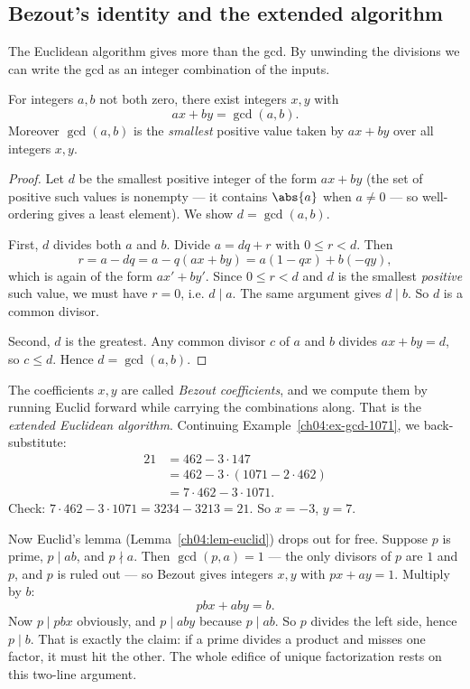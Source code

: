 \subsection*{Bezout's identity and the extended algorithm}

The Euclidean algorithm gives more than the gcd. By unwinding the divisions we can write the gcd as
an integer combination of the inputs.

\begin{theorem}
\label{ch04:thm-bezout}
For integers $a, b$ not both zero, there exist integers $x, y$ with
\[
  ax + by = \gcd(a, b).
\]
Moreover $\gcd(a,b)$ is the \emph{smallest} positive value taken by $ax + by$ over all integers
$x, y$.
\end{theorem}

\begin{proof}
Let $d$ be the smallest positive integer of the form $ax + by$ (the set of positive such values is
nonempty --- it contains $\abs{a}$ when $a \neq 0$ --- so well-ordering gives a least element). We
show $d = \gcd(a, b)$.

First, $d$ divides both $a$ and $b$. Divide $a = dq + r$ with $0 \le r < d$. Then
\[
  r = a - dq = a - q(ax + by) = a(1 - qx) + b(-qy),
\]
which is again of the form $a x' + b y'$. Since $0 \le r < d$ and $d$ is the smallest
\emph{positive} such value, we must have $r = 0$, i.e. $d \mid a$. The same argument gives
$d \mid b$. So $d$ is a common divisor.

Second, $d$ is the greatest. Any common divisor $c$ of $a$ and $b$ divides $ax + by = d$, so
$c \le d$. Hence $d = \gcd(a, b)$.
\end{proof}

The coefficients $x, y$ are called \emph{Bezout coefficients}, and we compute them by running
Euclid forward while carrying the combinations along. That is the \emph{extended Euclidean
algorithm}. Continuing Example~\ref{ch04:ex-gcd-1071}, we back-substitute:
\[
\begin{aligned}
21 &= 462 - 3 \cdot 147 \\
   &= 462 - 3 \cdot (1071 - 2 \cdot 462) \\
   &= 7 \cdot 462 - 3 \cdot 1071.
\end{aligned}
\]
Check: $7 \cdot 462 - 3 \cdot 1071 = 3234 - 3213 = 21$. So $x = -3$, $y = 7$.

\begin{whybox}
Now Euclid's lemma (Lemma~\ref{ch04:lem-euclid}) drops out for free. Suppose $p$ is prime,
$p \mid ab$, and $p \nmid a$. Then $\gcd(p, a) = 1$ --- the only divisors of $p$ are $1$ and $p$,
and $p$ is ruled out --- so Bezout gives integers $x, y$ with $px + ay = 1$. Multiply by $b$:
\[
  pbx + aby = b.
\]
Now $p \mid pbx$ obviously, and $p \mid aby$ because $p \mid ab$. So $p$ divides the left side,
hence $p \mid b$. That is exactly the claim: if a prime divides a product and misses one factor, it
must hit the other. The whole edifice of unique factorization rests on this two-line argument.
\end{whybox}

